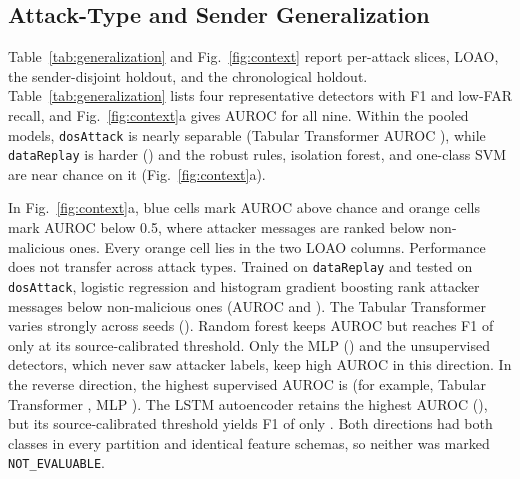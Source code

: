 \documentclass[preprint,12pt,numafflabel]{elsarticle}
\begin{document}
\subsection{Attack-Type and Sender Generalization}
Table~\ref{tab:generalization} and Fig.~\ref{fig:context} report per-attack slices, LOAO, the sender-disjoint holdout, and the chronological holdout. Table~\ref{tab:generalization} lists four representative detectors with F1 and low-FAR recall, and Fig.~\ref{fig:context}a gives AUROC for all nine. Within the pooled models, \texttt{dosAttack} is nearly separable (Tabular Transformer AUROC \ResDoSOnlyTabTransformerAUROC), while \texttt{dataReplay} is harder (\ResReplayOnlyTabTransformerAUROC) and the robust rules, isolation forest, and one-class SVM are near chance on it (Fig.~\ref{fig:context}a).

In Fig.~\ref{fig:context}a, blue cells mark AUROC above chance and orange cells mark AUROC below 0.5, where attacker messages are ranked below non-malicious ones. Every orange cell lies in the two LOAO columns. Performance does not transfer across attack types. Trained on \texttt{dataReplay} and tested on \texttt{dosAttack}, logistic regression and histogram gradient boosting rank attacker messages below non-malicious ones (AUROC \ResLOAOReplayToDoSLogRegAUROC{} and \ResLOAOReplayToDoSHGBAUROC). The Tabular Transformer varies strongly across seeds (\ResLOAOReplayToDoSTabTransformerAUROC). Random forest keeps AUROC \ResLOAOReplayToDoSRandomForestAUROC{} but reaches F1 of only \ResLOAOReplayToDoSRandomForestFOne{} at its source-calibrated threshold. Only the MLP (\ResLOAOReplayToDoSMLPAUROC) and the unsupervised detectors, which never saw attacker labels, keep high AUROC in this direction. In the reverse direction, the highest supervised AUROC is \ResLOAODoSToReplaySupMaxAUROC{} (for example, Tabular Transformer \ResLOAODoSToReplayTabTransformerAUROC, MLP \ResLOAODoSToReplayMLPAUROC). The LSTM autoencoder retains the highest AUROC (\ResLOAODoSToReplayLSTMAEAUROC), but its source-calibrated threshold yields F1 of only \ResLOAODoSToReplayLSTMAEFOne. Both directions had both classes in every partition and identical feature schemas, so neither was marked \texttt{NOT\_EVALUABLE}.
\end{document}

